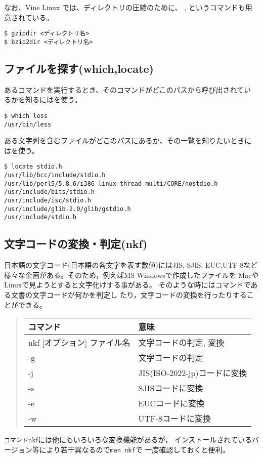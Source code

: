 \documentclass{jreport}
\begin{document}
なお、Vine Linux では、ディレクトリの圧縮のために、
, というコマンドも用意されている。
\begin{screen}
\begin{verbatim}
$ gzipdir <ディレクトリ名>
$ bzip2dir <ディレクトリ名>
\end{verbatim}
\end{screen}

\subsection{ファイルを探す(which,locate)}
あるコマンドを実行するとき、そのコマンドがどこのパスから呼び出されてい
るかを知るにはを使う。
\begin{screen}
\begin{verbatim}
$ which less
/usr/bin/less
\end{verbatim}
\end{screen}

ある文字列を含むファイルがどこのパスにあるか、その一覧を知りたいときに
はを使う。
\begin{screen}
\begin{verbatim}
$ locate stdio.h
/usr/lib/bcc/include/stdio.h
/usr/lib/perl5/5.8.6/i386-linux-thread-multi/CORE/nostdio.h
/usr/include/bits/stdio.h
/usr/include/isc/stdio.h
/usr/include/glib-2.0/glib/gstdio.h
/usr/include/stdio.h
\end{verbatim}
\end{screen}

\subsection{文字コードの変換・判定(nkf)}
日本語の文字コード(日本語の各文字を表す数値)にはJIS, SJIS, EUC,UTF-8など
様々な企画がある。そのため，例えばMS Windowsで作成したファイルを
MacやLinuxで見ようとすると文字化けする事がある。
そのような時にはコマンドである文書の文字コードが何かを判定し
たり，文字コードの変換を行ったりすることができる。

\begin{quote}
\begin{tabular}[t]{ll}\hline
コマンド & 意味 \\ \hline
nkf [オプション] ファイル名 & 文字コードの判定, 変換\\
\qquad -g & 文字コードの判定\\
\qquad -j & JIS(ISO-2022-jp)コードに変換\\
\qquad -s & SJISコードに変換\\
\qquad -e & EUCコードに変換\\
\qquad -w & UTF-8コードに変換\\
\hline
\end{tabular}
\end{quote}
\verb|コマンド|nkfには他にもいろいろな変換機能があるが，
インストールされているバージョン等により若干異なるので\verb|man nkf|で
一度確認しておくと便利。
\end{document}
